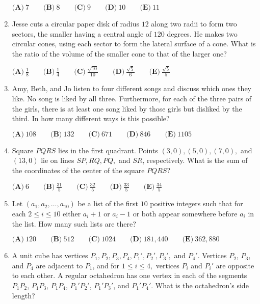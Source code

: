 \documentclass{article}
\begin{document}
\begin{enumerate}[label=\arabic*., itemsep=0.5em]
$ \textbf{(A)}\ 7\qquad\textbf{(B)}\ 8\qquad\textbf{(C)}\ 9\qquad\textbf{(D)}\ 10\qquad\textbf{(E)}\ 11 $\par \vspace{0.5em}\item Jesse cuts a circular paper disk of radius $12$ along two radii to form two sectors, the smaller having a central angle of $120$ degrees. He makes two circular cones, using each sector to form the lateral surface of a cone. What is the ratio of the volume of the smaller cone to that of the larger one?

$\textbf{(A)}\ \frac{1}{8}\qquad\textbf{(B)}\ \frac{1}{4}\qquad\textbf{(C)}\ \frac{\sqrt{10}}{10}\qquad\textbf{(D)}\ \frac{\sqrt{5}}{6}\qquad\textbf{(E)}\ \frac{\sqrt{5}}{5}$\par \vspace{0.5em}\item Amy, Beth, and Jo listen to four different songs and discuss which ones they like. No song is liked by all three. Furthermore, for each of the three pairs of the girls, there is at least one song liked by those girls but disliked by the third. In how many different ways is this possible?

$\textbf{(A)}\ 108\qquad\textbf{(B)}\ 132\qquad\textbf{(C)}\ 671\qquad\textbf{(D)}\ 846\qquad\textbf{(E)}\ 1105 $\par \vspace{0.5em}\item Square $PQRS$ lies in the first quadrant. Points $(3,0), (5,0), (7,0),$ and $(13,0)$ lie on lines $SP, RQ, PQ,$ and $SR$, respectively. What is the sum of the coordinates of the center of the square $PQRS$?

$\textbf{(A)}\ 6\qquad\textbf{(B)}\ \frac{31}{5}\qquad\textbf{(C)}\ \frac{32}{5}\qquad\textbf{(D)}\ \frac{33}{5}\qquad\textbf{(E)}\ \frac{34}{5} $\par \vspace{0.5em}\item Let $(a_1,a_2, \dots ,a_{10})$ be a list of the first $10$ positive integers such that for each $2 \le i \le 10$ either $a_i+1$ or $a_i-1$ or both appear somewhere before $a_i$ in the list. How many such lists are there?

$\textbf{(A)}\ 120\qquad\textbf{(B)}\ 512\qquad\textbf{(C)}\ 1024\qquad\textbf{(D)}\ 181,440\qquad\textbf{(E)}\ 362,880$\par \vspace{0.5em}\item A unit cube has vertices $P_1,P_2,P_3,P_4,P_1',P_2',P_3',$ and $P_4'$. Vertices $P_2$, $P_3$, and $P_4$ are adjacent to $P_1$, and for $1\le i\le 4,$ vertices $P_i$ and $P_i'$ are opposite to each other. A regular octahedron has one vertex in each of the segments $P_1P_2$, $P_1P_3$, $P_1P_4$, $P_1'P_2'$, $P_1'P_3'$, and $P_1'P_4'$. What is the octahedron's side length?



\end{enumerate}
\end{document}
